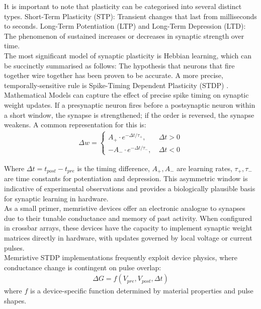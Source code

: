 \noindent It is important to note that plasticity can be categorised into several distinct types. Short-Term Plasticity (STP): Transient changes that last from milliseconds to seconds. Long-Term Potentiation (LTP) and Long-Term Depression (LTD): The phenomenon of sustained increases or decreases in synaptic strength over time. \\

\noindent The most significant model of synaptic plasticity is Hebbian learning, which can be succinctly summarised as follows: The hypothesis that neurons that fire together wire together has been proven to be accurate. A more precise, temporally-sensitive rule is Spike-Timing Dependent Plasticity (STDP) \cite{zheng2018learning}. \\

\noindent Mathematical Models can capture the effect of precise spike timing on synaptic weight updates. If a presynaptic neuron fires before a postsynaptic neuron within a short window, the synapse is strengthened; if the order is reversed, the synapse weakens. A common representation for this is:
\begin{align}
\Delta w = \left\{ \begin{array}{cl}
    A_+ \cdot e^{-\Delta t/\tau_+}, & \ \Delta t > 0 \\
    -A_- \cdot e^{-\Delta t/\tau_-}, & \ \Delta t < 0
    \end{array} \right. \label{eq:2.20}
\end{align}

\noindent Where $\Delta t = t_{post} - t_{pre}$ is the timing difference, $A_+, A_-$ are learning rates, $\tau_+, \tau_-$ are time constants for potentiation and depression. This asymmetric window is indicative of experimental observations and provides a biologically plausible basis for synaptic learning in hardware.\\

\noindent As a small primer, memristive devices offer an electronic analogue to synapses due to their tunable conductance and memory of past activity. When configured in crossbar arrays, these devices have the capacity to implement synaptic weight matrices directly in hardware, with updates governed by local voltage or current pulses.\\

\noindent Memristive STDP implementations frequently exploit device physics, where conductance change is contingent on pulse overlap:
\begin{align}
    \Delta G = f(V_{pre}, V_{post}, \Delta t) \label{eq:2.21}
\end{align}
\noindent where $f$ is a device-specific function determined by material properties and pulse shapes. \\

